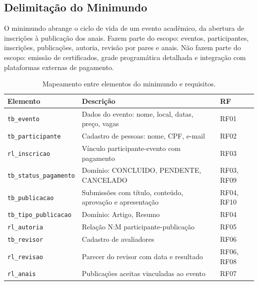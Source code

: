 \documentclass[12pt]{article}
\begin{document}
\subsection{Delimitação do Minimundo}
\label{subsec:minimundo}

O minimundo abrange o ciclo de vida de um evento acadêmico, da abertura de inscrições à publicação dos anais. Fazem parte do escopo: eventos, participantes, inscrições, publicações, autoria, revisão por pares e anais. Não fazem parte do escopo: emissão de certificados, grade programática detalhada e integração com plataformas externas de pagamento.

\begin{table}[htb]
\centering
\caption{Mapeamento entre elementos do minimundo e requisitos.}
\label{tab:minimundo-requisitos}
\small
\begin{tabularx}{\textwidth}{|l|X|l|}
\hline
\textbf{Elemento} & \textbf{Descrição} & \textbf{RF} \\
\hline
\texttt{tb\_evento}            & Dados do evento: nome, local, datas, preço, vagas        & RF01 \\
\hline
\texttt{tb\_participante}      & Cadastro de pessoas: nome, CPF, e-mail                   & RF02 \\
\hline
\texttt{rl\_inscricao}         & Vínculo participante-evento com pagamento                & RF03 \\
\hline
\texttt{tb\_status\_pagamento} & Domínio: CONCLUIDO, PENDENTE, CANCELADO                  & RF03, RF09 \\
\hline
\texttt{tb\_publicacao}        & Submissões com título, conteúdo, aprovação e apresentação & RF04, RF10 \\
\hline
\texttt{tb\_tipo\_publicacao}  & Domínio: Artigo, Resumo                                  & RF04 \\
\hline
\texttt{rl\_autoria}           & Relação N:M participante-publicação                      & RF05 \\
\hline
\texttt{tb\_revisor}           & Cadastro de avaliadores                                  & RF06 \\
\hline
\texttt{rl\_revisao}           & Parecer do revisor com data e resultado                  & RF06, RF08 \\
\hline
\texttt{rl\_anais}             & Publicações aceitas vinculadas ao evento                 & RF07 \\
\hline
\end{tabularx}
\end{table}
\end{document}

